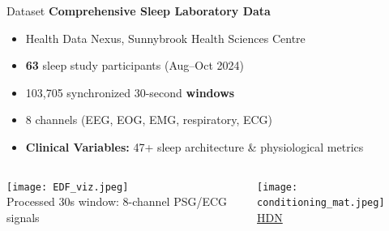 \documentclass[aspectratio=169,11pt]{beamer}
\begin{document}
\begin{frame}{Dataset}
  \textbf{\textcolor{tcairemblue}{Comprehensive Sleep Laboratory Data}}
  \begin{itemize}
    \item Health Data Nexus, Sunnybrook Health Sciences Centre
    \item \textbf{63} sleep study participants (Aug--Oct 2024)
    \item 103,705 synchronized 30-second \textbf{windows}
    \item 8 channels (EEG, EOG, EMG, respiratory, ECG)
    \item \textbf{Clinical Variables:} 47+ sleep architecture \& physiological metrics\\
  \end{itemize}



  \begin{columns}[T,onlytextwidth]
    \begin{column}{0.6\textwidth}
      \texttt{[image: EDF\_viz.jpeg]}\\
      \tiny Processed 30s window: 8-channel PSG/ECG signals
    \end{column}
    \begin{column}{0.38\textwidth}
      \texttt{[image: conditioning\_mat.jpeg]}\\
  \tiny
 \href{https://doi.org/10.57764/tvsv-y363}{HDN}
    \end{column}
  \end{columns}
\end{frame}

\end{document}
